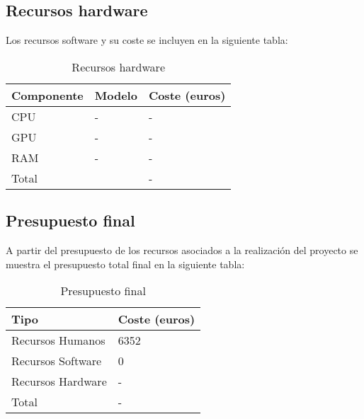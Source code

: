 \subsection{Recursos hardware}\label{subsec:recursos-hardware}
Los recursos software y su coste se incluyen en la siguiente tabla:

\begin{table}[H]
    \centering
    \begin{tabular}{|l|l|l|}
        \hline
        \textbf{Componente} & \textbf{Modelo} & \textbf{Coste (euros)} \\
        \hline
        CPU & - & - \\
        \hline
        GPU & - & - \\
        \hline
        RAM & - & - \\
        \hline
        \hline
        Total &  & - \\
        \hline
    \end{tabular}
    \caption{Recursos hardware}
    \label{tab:tabla_recursos_hardware}
\end{table}


\subsection{Presupuesto final}\label{subsec:presupuesto-final}
A partir del presupuesto de los recursos asociados a la realización del proyecto se muestra el presupuesto total final
en la siguiente tabla:

\begin{table}[H]
    \centering
    \begin{tabular}{|l|l|}
        \hline
        \textbf{Tipo} & \textbf{Coste (euros)} \\
        \hline
        Recursos Humanos & 6352 \\
        \hline
        Recursos Software & 0 \\
        \hline
        Recursos Hardware & - \\
        \hline
        \hline
        Total & - \\
        \hline
    \end{tabular}
    \caption{Presupuesto final}
    \label{tab:tabla_presupuesto_final}
\end{table}